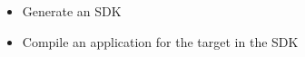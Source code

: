 {
  \begin{itemize}
    \item Generate an SDK
    \item Compile an application for the target in the SDK
  \end{itemize}
}

